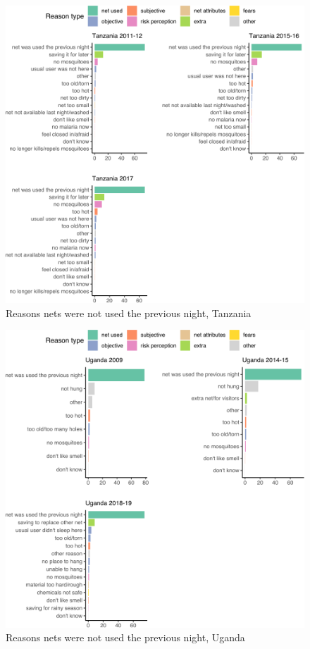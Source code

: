 \documentclass[review,
3p]{elsarticle} %
\begin{document}
\begin{figure}

{\centering \includegraphics[width=1\linewidth]{reasons_paper_files/figure-latex/tz_reas-1} 

}

\caption{\label{tz_reas}Reasons nets were not used the previous night, Tanzania}\label{fig:tz_reas}
\end{figure}

\begin{figure}

{\centering \includegraphics[width=1\linewidth]{reasons_paper_files/figure-latex/ug_reas-1} 

}

\caption{\label{ug_reas}Reasons nets were not used the previous night, Uganda}\label{fig:ug_reas}
\end{figure}


\end{document}
